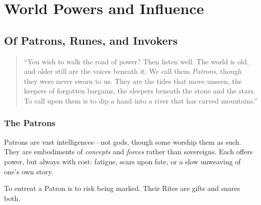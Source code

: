 \chapter{World Powers and Influence}
\label{ch:world-powers-obligation}

\section{Of Patrons, Runes, and Invokers}
\label{sec:invoker-lore}

\begin{quote}
``You wish to walk the road of power? Then listen well. The world is old, and older still are the voices beneath it. We call them \textit{Patrons}, though they were never sworn to us. They are the tides that move unseen, the keepers of forgotten bargains, the sleepers beneath the stone and the stars. To call upon them is to dip a hand into a river that has carved mountains.''
\end{quote}

\subsection{The Patrons}

Patrons are vast intelligences---not gods, though some worship them as such. They are embodiments of \textit{concepts} and \textit{forces} rather than sovereigns. Each offers power, but always with cost: fatigue, scars upon fate, or a slow unweaving of one's own story.

To entreat a Patron is to risk being marked. Their Rites are gifts and snares both.

